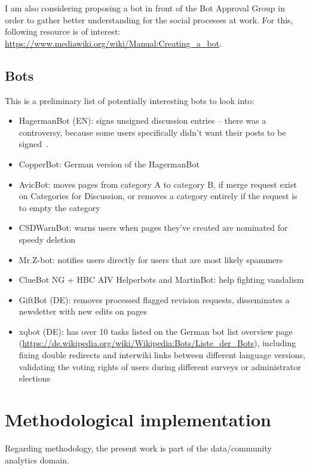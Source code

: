 \documentclass[pdftex,a4paper,11pt]{scrartcl}
\begin{document}
I am also considering proposing a bot in front of the Bot Approval Group in order to gather better understanding for the social processes at work.
For this, following resource is of interest: \url{https://www.mediawiki.org/wiki/Manual:Creating_a_bot}.

\subsection{Bots}

This is a preliminary list of potentially interesting bots to look into:

\begin{itemize}
  \item HagermanBot (EN): signs unsigned discussion entries -- there was a
  controversy, because some users specifically didn't want their posts to be
  signed~\cite{MueDoHer2013}. %
  \item CopperBot: German version of the HagermanBot
  \item AvicBot: moves pages from category A to category B, if merge request exist on Categories for Discussion, or removes a category entirely if the request is to empty the category
  \item CSDWarnBot: warns users when pages they've created are nominated for speedy deletion
  \item Mr.Z-bot: notifies users directly for users that are most likely spammers
  \item ClueBot NG + HBC AIV Helperbots and MartinBot: help fighting vandalism
  \item GiftBot (DE): removes processed flagged revision requests, disseminates a newsletter with new edits on pages
  \item xqbot (DE): has over 10 tasks listed on the German bot list overview page (\url{https://de.wikipedia.org/wiki/Wikipedia:Bots/Liste_der_Bots}), including fixing double redirects and interwiki links between different language versions, validating the voting rights of users during different surveys or administrator elections
\end{itemize}


\section{Methodological implementation}
Regarding methodology, the present work is part of the data/community analytics domain. %
\end{document}
